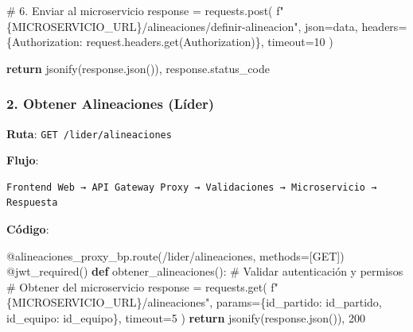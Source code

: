 \documentclass[
  spanish,
  11pt,
  letterpaper,
]{book}
\newenvironment{Shaded}{\begin{snugshade}}{\end{snugshade}}
\newcommand{\AttributeTok}[1]{\textcolor[rgb]{0.40,0.45,0.13}{#1}}
\newcommand{\CommentTok}[1]{\textcolor[rgb]{0.37,0.37,0.37}{#1}}
\newcommand{\ControlFlowTok}[1]{\textcolor[rgb]{0.00,0.23,0.31}{\textbf{#1}}}
\newcommand{\DecValTok}[1]{\textcolor[rgb]{0.68,0.00,0.00}{#1}}
\newcommand{\KeywordTok}[1]{\textcolor[rgb]{0.00,0.23,0.31}{\textbf{#1}}}
\newcommand{\NormalTok}[1]{\textcolor[rgb]{0.00,0.23,0.31}{#1}}
\newcommand{\OperatorTok}[1]{\textcolor[rgb]{0.37,0.37,0.37}{#1}}
\newcommand{\SpecialCharTok}[1]{\textcolor[rgb]{0.37,0.37,0.37}{#1}}
\newcommand{\SpecialStringTok}[1]{\textcolor[rgb]{0.13,0.47,0.30}{#1}}
\newcommand{\StringTok}[1]{\textcolor[rgb]{0.13,0.47,0.30}{#1}}
\begin{document}
\begin{Shaded}
\begin{Highlighting}[]
    \CommentTok{\# 6. Enviar al microservicio}
\NormalTok{    response }\OperatorTok{=}\NormalTok{ requests.post(}
        \SpecialStringTok{f"}\SpecialCharTok{\{}\NormalTok{MICROSERVICIO\_URL}\SpecialCharTok{\}}\SpecialStringTok{/alineaciones/definir{-}alineacion"}\NormalTok{,}
\NormalTok{        json}\OperatorTok{=}\NormalTok{data,}
\NormalTok{        headers}\OperatorTok{=}\NormalTok{\{}\StringTok{\textquotesingle{}Authorization\textquotesingle{}}\NormalTok{: request.headers.get(}\StringTok{\textquotesingle{}Authorization\textquotesingle{}}\NormalTok{)\},}
\NormalTok{        timeout}\OperatorTok{=}\DecValTok{10}
\NormalTok{    )}
    
    \ControlFlowTok{return}\NormalTok{ jsonify(response.json()), response.status\_code}
\end{Highlighting}
\end{Shaded}

\subsubsection{2. Obtener Alineaciones
(Líder)}\label{obtener-alineaciones-luxedder}

\textbf{Ruta}: \texttt{GET\ /lider/alineaciones}

\textbf{Flujo}:

\begin{verbatim}
Frontend Web → API Gateway Proxy → Validaciones → Microservicio → Respuesta
\end{verbatim}

\textbf{Código}:

\begin{Shaded}
\begin{Highlighting}[]
\AttributeTok{@alineaciones\_proxy\_bp.route}\NormalTok{(}\StringTok{\textquotesingle{}/lider/alineaciones\textquotesingle{}}\NormalTok{, methods}\OperatorTok{=}\NormalTok{[}\StringTok{\textquotesingle{}GET\textquotesingle{}}\NormalTok{])}
\AttributeTok{@jwt\_required}\NormalTok{()}
\KeywordTok{def}\NormalTok{ obtener\_alineaciones():}
    \CommentTok{\# Validar autenticación y permisos}
    \CommentTok{\# Obtener del microservicio}
\NormalTok{    response }\OperatorTok{=}\NormalTok{ requests.get(}
        \SpecialStringTok{f"}\SpecialCharTok{\{}\NormalTok{MICROSERVICIO\_URL}\SpecialCharTok{\}}\SpecialStringTok{/alineaciones"}\NormalTok{,}
\NormalTok{        params}\OperatorTok{=}\NormalTok{\{}\StringTok{\textquotesingle{}id\_partido\textquotesingle{}}\NormalTok{: id\_partido, }\StringTok{\textquotesingle{}id\_equipo\textquotesingle{}}\NormalTok{: id\_equipo\},}
\NormalTok{        timeout}\OperatorTok{=}\DecValTok{5}
\NormalTok{    )}
    \ControlFlowTok{return}\NormalTok{ jsonify(response.json()), }\DecValTok{200}
\end{Highlighting}
\end{Shaded}
\end{document}
